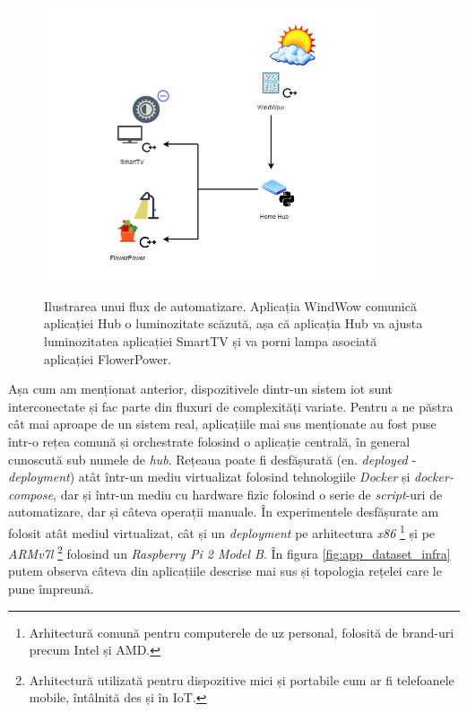 \begin{figure}[h]
    \centering
    \caption{\centering Ilustrarea unui flux de automatizare. Aplicația WindWow comunică aplicației Hub o luminozitate scăzută, așa că aplicația Hub va ajusta luminozitatea aplicației SmartTV și va porni lampa asociată aplicației FlowerPower.}
    \includegraphics[width=0.9\textwidth]{images/smarthome_automation.drawio (2).png}
    \label{fig:app_flux}
\end{figure}

Așa cum am menționat anterior, dispozitivele dintr-un sistem \acrshort{iot} sunt interconectate și fac parte din fluxuri de complexități variate. Pentru a ne păstra cât mai aproape de un sistem real, aplicațiile mai sus menționate au fost puse într-o rețea comună și orchestrate folosind o aplicație centrală, în general cunoscută sub numele de \textit{hub}. Rețeaua poate fi desfășurată (en. \textit{deployed} - \textit{deployment}) atât într-un mediu virtualizat folosind tehnologiile \textit{Docker} și \textit{docker-compose}, dar și într-un mediu cu hardware fizic folosind o serie de \textit{script}-uri de automatizare, dar și câteva operații manuale. În experimentele desfășurate am folosit atât mediul virtualizat, cât și un \textit{deployment} pe arhitectura \textit{x86} \footnote{Arhitectură comună pentru computerele de uz personal, folosită de brand-uri precum Intel și AMD.} și pe \textit{ARMv7l} \footnote{Arhitectură utilizată pentru dispozitive mici și portabile cum ar fi telefoanele mobile, întâlnită des și în IoT.} folosind un \textit{Raspberry Pi 2 Model B}. În figura \ref{fig:app_dataset_infra} putem observa câteva din aplicațiile descrise mai sus și topologia rețelei care le pune împreună.

